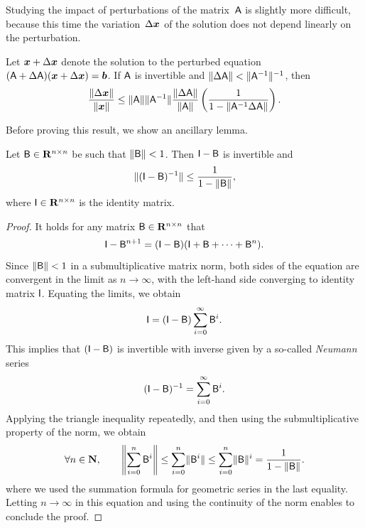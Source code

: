 Studying the impact of perturbations of the matrix~$\mat A$ is slightly more difficult,
because this time the variation~$\Delta \vect x$ of the solution does not depend linearly on the perturbation.
\begin{proposition}
    \label{proposition:linear_perturbation_matrix}
    Let $\vect x + \Delta \vect x$ denote the solution to the perturbed equation $(\mat A + \Delta \mat A) (\vect x + \Delta \vect x) = \vect b$.
    If $\mat A$ is invertible and $\norm{\Delta \mat A} < \norm{\mat A^{-1}}^{-1}$,
    then
    \begin{equation}
        \label{eq:linear_perturbation_matrix}
        \frac{\norm{\Delta \vect x}}{\norm{\vect x}}
        \leq \norm{\mat A} \norm{\mat A^{-1}} \frac{\norm{\Delta \mat A}}{\norm{\mat A}}
        \left(\frac{1}{1 - \norm{\mat A^{-1} \Delta \mat A}} \right).
    \end{equation}
\end{proposition}
Before proving this result,
we show an ancillary lemma.
\begin{lemma}
    \label{lemma:linear_inverse_neumann}
    Let $\mat B \in \real^{n \times n}$ be such that $\norm{\mat B} < 1$.
    Then $\mat I - \mat B$ is invertible and
    \begin{equation}
        \label{eq:linear_bound_inverse_perturbation_identity}
        \norm{(\mat I - \mat B)^{-1}}
        \leq \frac{1}{1 - \norm{\mat B}},
    \end{equation}
    where $\mat I \in \real^{n \times n}$ is the identity matrix.
\end{lemma}
\begin{proof}
    It holds for any matrix $\mat B \in \real^{n \times n}$ that
    \[
        \mat I - \mat B^{n+1} = (\mat I - \mat B)(\mat I + \mat B + \dotsb + \mat B^n).
    \]
    Since $\norm{\mat B} < 1$ in a submultiplicative matrix norm,
    both sides of the equation are convergent in the limit as $n \to \infty$,
    with the left-hand side converging to identity matrix $\mat I$.
    Equating the limits,
    we obtain
    \[
        \mat I = (\mat I - \mat B) \sum_{i=0}^{\infty} \mat B^i.
    \]
    This implies that $(\mat I - \mat B)$ is invertible with inverse
    given by a so-called \emph{Neumann} series
    \begin{equation*}
        (\mat I - \mat B)^{-1} = \sum_{i=0}^{\infty} \mat B^i.
    \end{equation*}
    Applying the triangle inequality repeatedly,
    and then using the submultiplicative property of the norm,
    we obtain
    \[
        \forall n \in \nat,
        \qquad
        \norm*{\sum_{i=0}^{n} \mat B^i}
        \leq \sum_{i=0}^{n} \norm{\mat B^i}
        \leq \sum_{i=0}^{n} \norm{\mat B}^i
        = \frac{1}{1 - \norm{\mat B}}.
    \]
    where we used the summation formula for geometric series in the last equality.
    Letting $n \to \infty$ in this equation and
    using the continuity of the norm enables to conclude the proof.
\end{proof}

